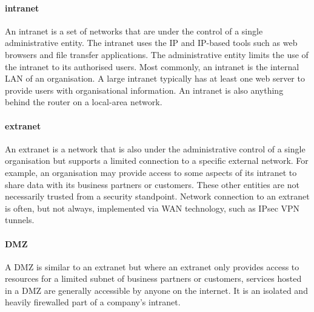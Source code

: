 {\paragraph{intranet}
An intranet is a set of networks that are under the control of a single administrative entity.
The intranet uses the \gls{IP} and \gls{IP}-based tools such as web browsers and file transfer applications.
The administrative entity limits the use of the intranet to its authorised users.
Most commonly, an intranet is the internal \gls{LAN} of an organisation.
A large intranet typically has at least one web server to provide users with organisational information.
An intranet is also anything behind the router on a local-area network.

\paragraph{extranet}
An extranet is a network that is also under the administrative control of a single organisation but supports a limited connection to a specific external network.
For example, an organisation may provide access to some aspects of its intranet to share data with its business partners or customers.
These other entities are not necessarily trusted from a security standpoint.
Network connection to an extranet is often, but not always, implemented via \gls{WAN} technology, such as IPsec \acs{VPN} tunnels.

\paragraph{\gls{DMZ}}
A \gls{DMZ} is similar to an extranet but where an extranet only provides access to resources for a limited subnet of business partners or customers, services hosted in a \gls{DMZ} are generally accessible by anyone on the internet.
It is an isolated and heavily firewalled part of a company's intranet.


\label{sec:network-topologies}



}

